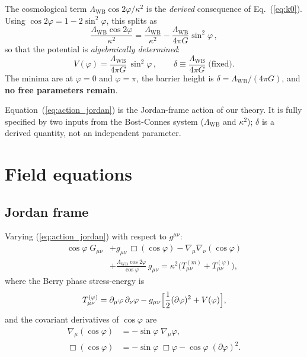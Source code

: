 \documentclass[aps,prd,twocolumn,superscriptaddress,nofootinbib]{revtex4-2}
\newcommand{\Lw}{\Lambda_{\mathrm{WB}}}
\begin{document}
The cosmological term $\Lw\cos 2\varphi/\kappa^2$ is the
\emph{derived} consequence of Eq.~(\ref{eq:k0}).
Using $\cos 2\varphi = 1 - 2\sin^2\varphi$, this splits as
\begin{equation}
  \frac{\Lw\cos 2\varphi}{\kappa^2}
  = \frac{\Lw}{\kappa^2}
  - \frac{\Lw}{4\pi G}\sin^2\varphi\,,
\end{equation}
so that the potential is \emph{algebraically determined}:
\begin{equation}
  V(\varphi) = \frac{\Lw}{4\pi G}\,\sin^2\varphi\,,
  \qquad
  \delta \equiv \frac{\Lw}{4\pi G}\;\text{(fixed)}.
  \label{eq:V_top}
\end{equation}
The minima are at $\varphi = 0$ and $\varphi = \pi$,
the barrier height is $\delta = \Lw/(4\pi G)$,
and \textbf{no free parameters remain}.

Equation~(\ref{eq:action_jordan}) is the Jordan-frame action
of our theory. It is fully specified by two inputs from
the Bost-Connes system ($\Lw$ and $\kappa^2$);
$\delta$ is a derived quantity, not an independent parameter.

\section{Field equations}
\label{sec:field_eqs}

\subsection{Jordan frame}

Varying (\ref{eq:action_jordan}) with respect to $g^{\mu\nu}$:
\begin{align}
  \cos\varphi\;G_{\mu\nu}
  &+ g_{\mu\nu}\,\Box(\cos\varphi)
  - \nabla_\mu\nabla_\nu(\cos\varphi)
  \nonumber \\
  &+ \frac{\Lw\cos 2\varphi}{\cos\varphi}\,g_{\mu\nu}
  = \kappa^2\bigl(T_{\mu\nu}^{(m)} + T_{\mu\nu}^{(\varphi)}\bigr),
  \label{eq:einstein_jordan}
\end{align}
where the Berry phase stress-energy is
\begin{equation}
  T_{\mu\nu}^{(\varphi)} = \partial_\mu\varphi\,\partial_\nu\varphi
  - g_{\mu\nu}\Bigl[\frac{1}{2}(\partial\varphi)^2
  + V(\varphi)\Bigr],
\end{equation}
and the covariant derivatives of $\cos\varphi$ are
\begin{align}
  \nabla_\mu(\cos\varphi) &= -\sin\varphi\;\nabla_\mu\varphi,
  \\
  \Box(\cos\varphi) &= -\sin\varphi\;\Box\varphi
  - \cos\varphi\;(\partial\varphi)^2.
\end{align}
\end{document}
